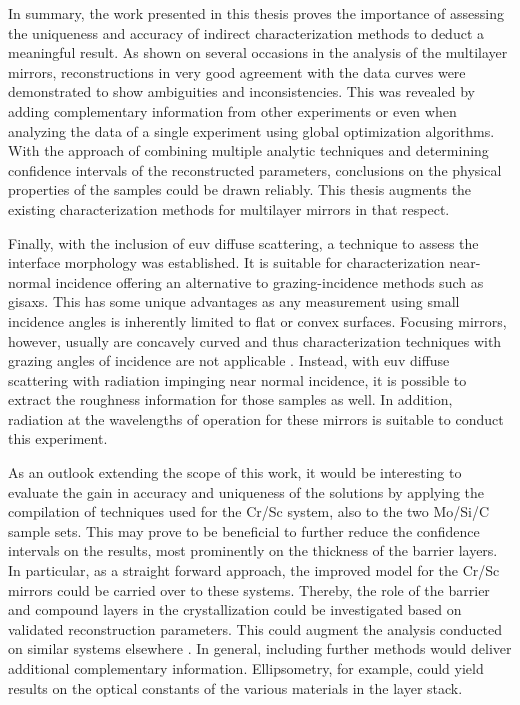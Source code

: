 In summary, the work presented in this thesis proves the importance of assessing the uniqueness and accuracy of indirect characterization methods to deduct a meaningful result. As shown on several occasions in the analysis of the multilayer mirrors, reconstructions in very good agreement with the data curves were demonstrated to show ambiguities and inconsistencies. This was revealed by adding complementary information from other experiments or even when analyzing the data of a single experiment using global optimization algorithms. With the approach of combining multiple analytic techniques and determining confidence intervals of the reconstructed parameters, conclusions on the physical properties of the samples could be drawn reliably. This thesis augments the existing characterization methods for multilayer mirrors in that respect.

Finally, with the inclusion of \gls{euv} diffuse scattering, a technique to assess the interface morphology was established. It is suitable for characterization near-normal incidence offering an alternative to grazing-incidence methods such as \gls{gisaxs}. This has some unique advantages as any measurement using small incidence angles is inherently limited to flat or convex surfaces. Focusing mirrors, however, usually are concavely curved and thus characterization techniques with grazing angles of incidence are not applicable . Instead, with \gls{euv} diffuse scattering with radiation impinging near normal incidence, it is possible to extract the roughness information for those samples as well. In addition, radiation at the wavelengths of operation for these mirrors is suitable to conduct this experiment.

As an outlook extending the scope of this work, it would be interesting to evaluate the gain in accuracy and uniqueness of the solutions by applying the compilation of techniques used for the Cr/Sc system, also to the two Mo/Si/C sample sets. This may prove to be beneficial to further reduce the confidence intervals on the results, most prominently on the thickness of the barrier layers. In particular, as a straight forward approach, the improved model for the Cr/Sc mirrors could be carried over to these systems. Thereby, the role of the barrier and compound layers in the crystallization could be investigated based on validated reconstruction parameters. This could augment the analysis conducted on similar systems elsewhere \cite{bajt_investigation_2001}. In general, including further methods would deliver additional complementary information. Ellipsometry, for example, could yield results on the optical constants of the various materials in the layer stack.